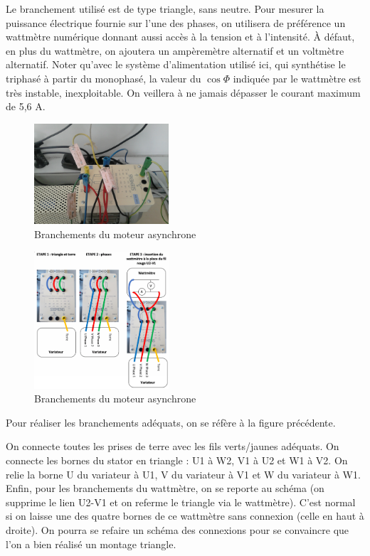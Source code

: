\documentclass{article}%
\begin{document}
Le branchement utilisé est de type triangle, sans neutre. Pour mesurer la puissance électrique fournie sur l'une des phases, on utilisera de préférence un wattmètre numérique donnant aussi accès à la tension et à l'intensité. À défaut, en plus du wattmètre, on ajoutera un ampèremètre alternatif et un voltmètre alternatif. Noter qu'avec le système d'alimentation utilisé ici, qui synthétise le triphasé à partir du monophasé, la valeur du $\cos\Phi$ indiquée par le wattmètre est très instable, inexploitable.
On veillera à ne jamais dépasser le courant maximum de 5,6 A.
\begin{figure}
	\centerline{\includegraphics[width=5cm]{images-exp/branchement_moteur_asynchrone.jpg}}
	\caption{Branchements du moteur asynchrone}
\end{figure}
\begin{figure}
	\centerline{\includegraphics[width=5cm]{images-exp/BranchementsAsynchrone.jpg}}
	\caption{Branchements du moteur asynchrone}
\end{figure}

Pour réaliser les branchements adéquats, on se réfère à la figure précédente.

    On connecte toutes les prises de terre avec les fils verts/jaunes adéquats.
    On connecte les bornes du stator en triangle : U1 à W2, V1 à U2 et W1 à V2.
    On relie la borne U du variateur à U1, V du variateur à V1 et W du variateur à W1.
    Enfin, pour les branchements du wattmètre, on se reporte au schéma (on supprime le lien U2-V1 et on referme le triangle via le wattmètre). C'est normal si on laisse une des quatre bornes de ce wattmètre sans connexion (celle en haut à droite). On pourra se refaire un schéma des connexions pour se convaincre que l'on a bien réalisé un montage triangle.
\end{document}
